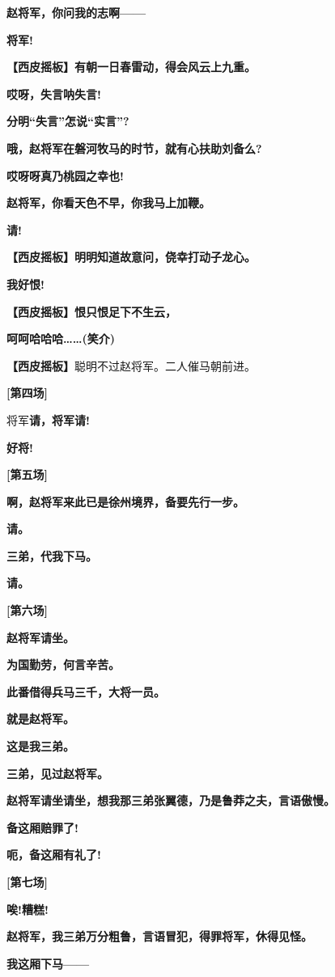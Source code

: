\textbf{赵将军，你问我的志啊------}

\textbf{将军!}

\textbf{【西皮摇板】有朝一日春雷动，得会风云上九重。}

\textbf{哎呀，失言呐失言!}

\textbf{分明``失言''怎说``实言''?}

\textbf{哦，赵将军在磐河牧马的时节，就有心扶助刘备么?}

\textbf{哎呀呀真乃桃园之幸也!}

\textbf{赵将军，你看天色不早，你我马上加鞭。}

\textbf{请!}

\textbf{【西皮摇板】明明知道故意问，侥幸打动子龙心。}

\textbf{我好恨!}

\textbf{【西皮摇板】恨只恨足下不生云，}

\textbf{呵呵哈哈哈\ldots{}\ldots{}(笑介)}

\textbf{【西皮摇板】}聪明不过赵将军。二人催马朝前进。

\textbf{{[}第四场{]}}

将军\textbf{请，将军请!}

\textbf{好将!}

\textbf{{[}第五场{]}}

\textbf{啊，赵将军来此已是徐州境界，备要先行一步。}

\textbf{请。}

\textbf{三弟，代我下马。}

\textbf{请。}

\textbf{{[}第六场{]}}

\textbf{赵将军请坐。}

\textbf{为国勤劳，何言辛苦。}

\textbf{此番借得兵马三千，大将一员。}

\textbf{就是赵将军。}

\textbf{这是我三弟。}

\textbf{三弟，见过赵将军。}

\textbf{赵将军请坐请坐，想我那三弟张翼德，乃是鲁莽之夫，言语傲慢。}

\textbf{备这厢赔罪了!}

\textbf{呃，备这厢有礼了!}

\textbf{{[}第七场{]}}

\textbf{唉!糟糕!}

\textbf{赵将军，我三弟万分粗鲁，言语冒犯，得罪将军，休得见怪。}

\textbf{我这厢下马------}

